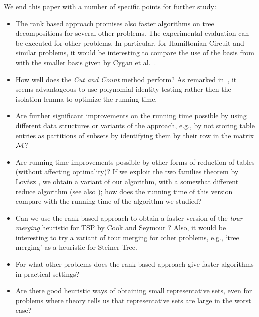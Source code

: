 \documentclass{llncs}
\begin{document}
We end this paper with a number of specific points for further study:
\begin{itemize}
\item The rank based approach promises also faster algorithms on tree decompositions for several other 
problems. The experimental evaluation can be executed for other problems. In particular, for
{\sc Hamiltonian Circuit} and similar problems, it would be interesting to compare the
use of the basis from \cite{BodlaenderCKN12} with  the smaller basis
given by Cygan et al.~\cite{CyganKN12}.
\item How well does the \emph{Cut and Count} method perform? 
As remarked in~\cite{CyganNPPRW11}, it seems advantageous to use polynomial identity testing rather then the isolation lemma to optimize the running time.
\item Are further significant improvements on the running time possible by using different data structures
or variants of the approach, e.g., by not storing table entries as partitions of subsets by identifying them
by their row in the matrix $\cal{M}$? 
\item Are running time improvements possible by other forms of reduction of tables (without affecting 
optimality)? If we exploit the two families theorem by Lov\'{a}sz \cite{Lovasz77},
we obtain a variant of our algorithm, with a somewhat different reduce algorithm \cite{FominLS13} (see
also \cite{Marx09}); how does the running time of this version compare with the running time
of the algorithm we studied?
\item Can we use the rank based approach to obtain a faster version of
the {\em tour merging} heuristic for TSP by Cook
and Seymour \cite{CookS03}? Also, it would be interesting to try a variant of tour merging 
for other problems, e.g., `tree merging' as a heuristic for {\sc Steiner Tree}.
\item For what other problems does the rank based approach give faster algorithms in
practical settings? 
\item Are there good heuristic ways of obtaining small representative sets, even for problems where
theory tells us that representative sets are large in the worst case?
\end{itemize}






\end{document}
